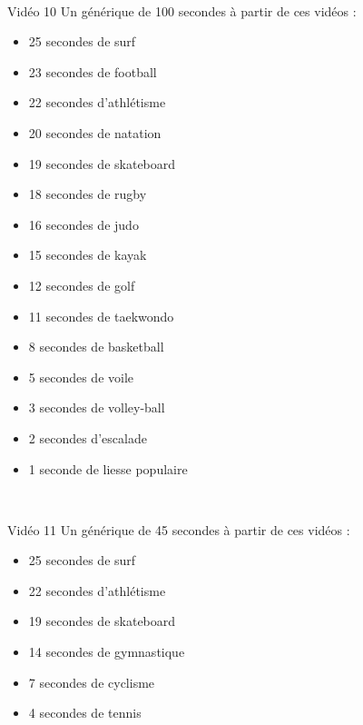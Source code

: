 \documentclass[10pt, a5paper,twoside]{article}
\begin{document}
\vfill

\clearpage
~
\vfill

\begin{card}[width = \textwidth, colback = olympicblue, colframe = olympicblue, bottomtitle = 2mm]{Vidéo 10}
  Un générique de 100 secondes à partir de ces vidéos :
  \vspace{-5mm}\begin{itemize}
    \item 25 secondes de surf
    \item 23 secondes de football
    \item 22 secondes d'athlétisme
    \item 20 secondes de natation
    \item 19 secondes de skateboard
    \item 18 secondes de rugby
    \item 16 secondes de judo
    \item 15 secondes de kayak
    \item 12 secondes de golf
    \item 11 secondes de taekwondo
    \item 8 secondes de basketball
    \item 5 secondes de voile
    \item 3 secondes de volley-ball
    \item 2 secondes d'escalade
    \item 1 seconde de liesse populaire
  \end{itemize}
\end{card}

\vfill

\clearpage
~
\vfill

\begin{card}[width = \textwidth, colback = olympicgreen, colframe = olympicgreen, bottomtitle = 2mm]{Vidéo 11}
  Un générique de 45 secondes à partir de ces vidéos :
  \vspace{-1mm}\begin{itemize}
    \item 25 secondes de surf
    \item 22 secondes d'athlétisme
    \item 19 secondes de skateboard
    \item 14 secondes de gymnastique
    \item 7 secondes de cyclisme
    \item 4 secondes de tennis
  \end{itemize}
\end{card}
\end{document}
